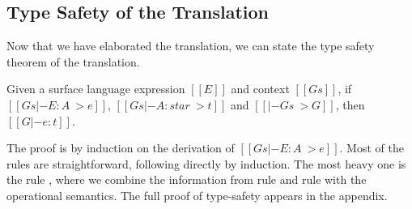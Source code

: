 \subsection{Type Safety of the Translation}

Now that we have elaborated the translation, we can state the
type safety theorem of the translation.

\begin{thm}
Given a surface language expression $[[E]]$ and context $[[Gs]]$, 
if $[[Gs |- E:A ~> e]]$, $[[Gs |- A:star ~> t]]$ and $[[|- Gs ~> G]]$, then
$[[G |- e:t]]$.
\end{thm}

The proof is by induction on the derivation of $[[Gs |- E : A ~> e]]$.
Most of the rules are straightforward, following directly by
induction. The most heavy one is the rule , where we
combine the information from rule  and rule
 with the operational semantics. The full proof of
type-safety appears in the appendix.

